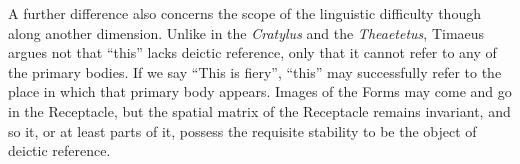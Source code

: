 A further difference also concerns the scope of the linguistic difficulty though along another dimension. Unlike in the \emph{Cratylus} and the \emph{Theaetetus}, Timaeus argues not that ``this'' lacks deictic reference, only that it cannot refer to any of the primary bodies. If we say ``This is fiery'', ``this'' may successfully refer to the place in which that primary body appears. Images of the Forms may come and go in the Receptacle, but the spatial matrix of the Receptacle remains invariant, and so it, or at least parts of it, possess the requisite stability to be the object of deictic reference.


